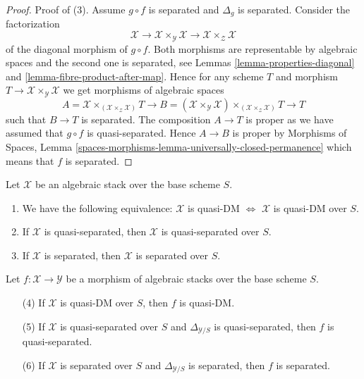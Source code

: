 \begin{proof}
\medskip\noindent
Proof of (3). Assume $g \circ f$ is separated and $\Delta_g$ is
separated. Consider the factorization
$$
\mathcal{X} \to
\mathcal{X} \times_\mathcal{Y} \mathcal{X} \to
\mathcal{X} \times_\mathcal{Z} \mathcal{X}
$$
of the diagonal morphism of $g \circ f$. Both morphisms are
representable by algebraic spaces and the second one is separated, see
Lemmas \ref{lemma-properties-diagonal} and
\ref{lemma-fibre-product-after-map}.
Hence for any scheme $T$ and morphism
$T \to \mathcal{X} \times_\mathcal{Y} \mathcal{X}$
we get morphisms of algebraic spaces
$$
A = \mathcal{X} \times_{(\mathcal{X} \times_{\mathcal{Z}} \mathcal{X})} T
\longrightarrow
B = (\mathcal{X} \times_\mathcal{Y} \mathcal{X})
\times_{(\mathcal{X} \times_{\mathcal{Z}} \mathcal{X})} T
\longrightarrow
T
$$
such that $B \to T$ is separated.
The composition $A \to T$ is proper as we have assumed that
$g \circ f$ is quasi-separated. Hence $A \to B$ is proper by
Morphisms of Spaces,
Lemma \ref{spaces-morphisms-lemma-universally-closed-permanence}
which means that $f$ is separated.
\end{proof}

\begin{lemma}
\label{lemma-separated-implies-morphism-separated}
Let $\mathcal{X}$ be an algebraic stack over the base scheme $S$.
\begin{enumerate}
\item We have the following equivalence:
$\mathcal{X}$ is quasi-DM $\Leftrightarrow$
$\mathcal{X}$ is quasi-DM over $S$.
\item If $\mathcal{X}$ is quasi-separated, then
$\mathcal{X}$ is quasi-separated over $S$.
\item If $\mathcal{X}$ is separated, then
$\mathcal{X}$ is separated over $S$.
\end{enumerate}
Let $f : \mathcal{X} \to \mathcal{Y}$ be a morphism of algebraic stacks
over the base scheme $S$.
\begin{enumerate}
\item[(4)] If $\mathcal{X}$ is quasi-DM over $S$, then $f$ is quasi-DM.
\item[(5)] If $\mathcal{X}$ is quasi-separated over $S$ and
$\Delta_{\mathcal{Y}/S}$ is quasi-separated, then $f$ is quasi-separated.
\item[(6)] If $\mathcal{X}$ is separated over $S$ and
$\Delta_{\mathcal{Y}/S}$ is separated, then $f$ is separated.
\end{enumerate}
\end{lemma}

